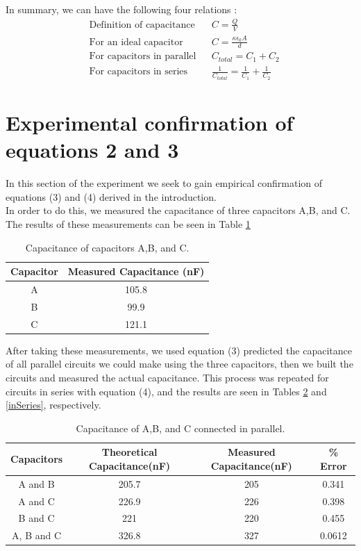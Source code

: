 \documentclass[oneside,12pt]{amsart}
\begin{document}
	\indent In summary, we can have the following four relations \cite{cap}\cite{parallel}:
	\begin{align}
	&\text{Definition of capacitance} &&	C = \frac{Q}{V}\\
	&\text{For an ideal capacitor} &&C = \frac{\kappa \epsilon _{0}A}{d}\\
	&\text{For capacitors in parallel} &&C_{total} = C_1 + C_2\\
	&\text{For capacitors in series} && \frac{1}{C_{total}} = \frac{1}{C_1}+\frac{1}{C_2}
	\end{align}
	
	\section{Experimental confirmation of equations 2 and 3}
	\indent In this section of the experiment we seek to gain empirical confirmation of equations (3) and (4) derived in the introduction.\\
	
	\indent In order to do this, we measured the capacitance of three capacitors A,B, and C. The results of these measurements can be seen in Table \ref{abc} 

	\begin{table}[H]
		\begin{tabular}{ |c|c|}
			\hline
			Capacitor & Measured Capacitance (nF)\\
			\hline
			A&105.8\\
			B&99.9\\
			C&121.1\\
			\hline
		\end{tabular}
		\caption{Capacitance of capacitors A,B, and C.}
		\label{abc}
	\end{table}

	\indent After taking these measurements, we used equation (3) predicted the capacitance of all parallel circuits we could make using the three capacitors, then we built the circuits and measured the actual capacitance. This process was repeated for circuits in series with equation (4), and the results are seen in Tables \ref{inParallel} and \ref{inSeries}, respectively. 
	\begin{table}[H]
		\begin{tabular}{ |c|c|c|c|}
			\hline
			Capacitors & Theoretical Capacitance(nF)& Measured Capacitance(nF) &\% Error\\
			\hline
			A and B	&205.7&205&0.341\\
			A and C&226.9 & 226&0.398\\
			B and C&221&220&0.455\\
			A, B and C&326.8&327&0.0612\\
			\hline
		\end{tabular}
		\caption{Capacitance of A,B, and C connected in parallel.}
		\label{inParallel}
	\end{table}
\end{document}
